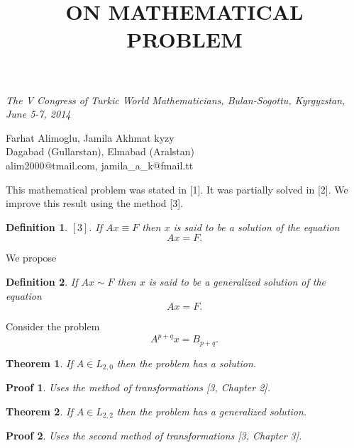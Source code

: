 \documentclass[12pt,a4paper,reqno]{amsart}
\begin{document}
\begin{minipage}[b]{15cm}
\footnotesize{\emph{The V Congress of Turkic World Mathematicians,
Bulan-Sogottu, Kyrgyzstan, June 5-7, 2014} \qquad}
\end{minipage}
\bigskip

\title{ON MATHEMATICAL PROBLEM}
\maketitle

\begin{center}
Farhat Alimoglu, Jamila Akhmat kyzy \\
Dagabad (Gullarstan), Elmabad (Aralstan) \\
alim2000@tmail.com, jamila\_a\_k@fmail.tt
\end{center}
\bigskip

This mathematical problem was stated in [1]. It was partially solved
in [2]. We improve this result using the method [3].

\newtheorem{Theorem}{Theorem}
\newtheorem{Definition}{Definition}
\newtheorem{Lemma}{Lemma}
\newtheorem{Proof}{Proof}
\newtheorem{Hypothesis}{Hypothesis}

\begin{Definition}
$[3].$ If $Ax \equiv F$ then $x$ is said to be a solution of the
equation \[Ax=F.\]
\end{Definition}
We propose
\begin{Definition} If $Ax \sim F$ then $x$ is said to be a
generalized solution of the equation \[Ax=F.\]
\end{Definition}
Consider the problem
\begin{equation}
A^{p+q}x=B_{p+q}.
\end{equation}

\begin{Theorem}
  If $A \in L_{2,0}$ then the problem has a solution.
\end{Theorem}
\begin{Proof}Uses the method of transformations [3, Chapter 2].
\end{Proof}

\begin{Theorem}If $A \in L_{2,2}$ then the problem has a
generalized solution.
\end{Theorem}

\begin{Proof}Uses the second method of transformations [3, Chapter
3].
\end{Proof}
\end{document}
